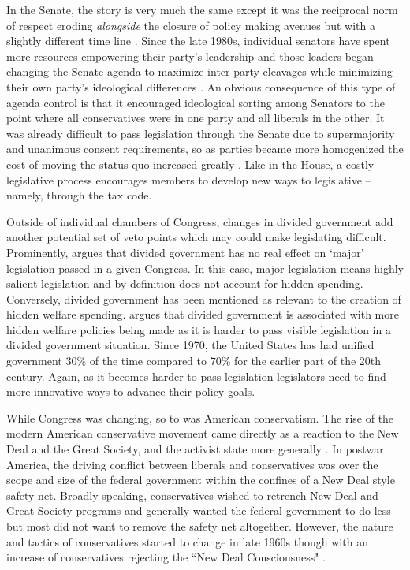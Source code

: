 \documentclass[12pt]{article}
\begin{document}
In the Senate, the story is very much the same except it was the reciprocal norm of respect eroding \emph{alongside} the closure of policy making avenues but with a slightly different time line \citep{sinclair1986}. Since the late 1980s, individual senators have spent more resources empowering their party's leadership and those leaders began changing the Senate agenda to maximize inter-party cleavages while minimizing their own party's ideological differences \citep{lee2008}. An obvious consequence of this type of agenda control is that it encouraged ideological sorting among Senators to the point where all conservatives were in one party and all liberals in the other. It was already difficult to pass legislation through the Senate due to supermajority and unanimous consent requirements, so as parties became more homogenized the cost of moving the status quo increased greatly \citep{koger2010}. Like in the House, a costly legislative process encourages members to develop new ways to legislative -- namely, through the tax code.

Outside of individual chambers of Congress, changes in divided government add another potential set of veto points which may could make legislating difficult. Prominently, \cite{mayhew1990} argues that divided government has no real effect on `major' legislation passed in a given Congress. In this case, major legislation means highly salient legislation and by definition does not account for hidden spending. Conversely, divided government has been mentioned as relevant to the creation of hidden welfare spending. \citet[Ch. 4]{howard2008} argues that divided government is associated with more hidden welfare policies being made as it is harder to pass visible legislation in a divided government situation. Since 1970, the United States has had unified government 30\% of the time compared to 70\% for the earlier part of the 20th century. Again, as it becomes harder to pass legislation legislators need to find more innovative ways to advance their policy goals.

While Congress was changing, so to was American conservatism. The rise of the modern American conservative movement came directly as a reaction to the New Deal and the Great Society, and the activist state more generally \citep{critchlow2007, zelizer2010}. In postwar America, the driving conflict between liberals and conservatives was over the scope and size of the federal government within the confines of a New Deal style safety net. Broadly speaking, conservatives wished to retrench New Deal and Great Society programs and generally wanted the federal government to do less but most did not want to remove the safety net altogether. However, the nature and tactics of conservatives started to change in late 1960s though with an increase of conservatives rejecting the ``New Deal Consciousness" \citep{teles2007, skocpol2007}.  
\end{document}

